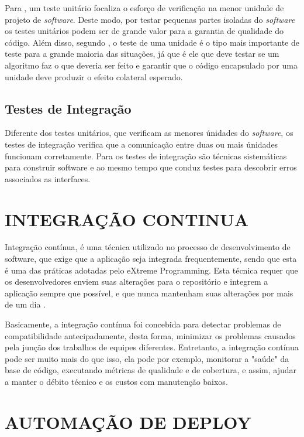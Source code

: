Para , um teste unitário focaliza o esforço de verificação na menor unidade de projeto de \textit{software}. Deste modo, por testar pequenas partes isoladas do \textit{software} os testes unitários podem ser de grande valor para a garantia de qualidade do código. Além disso, segundo , o teste de uma unidade é o tipo mais importante de teste para a grande maioria das situações, já que é ele que deve testar se um algoritmo faz o que deveria ser feito e garantir que o código encapsulado por uma unidade deve produzir o efeito colateral esperado.

\subsection{Testes de Integração}

Diferente dos testes unitários, que verificam as menores únidades do \textit{software}, os testes de integração verifica que a comunicação entre duas ou mais únidades funcionam corretamente. Para  os testes de integração são técnicas sistemáticas para construir software e ao mesmo tempo que conduz testes para descobrir erros associados as interfaces.

\section{INTEGRAÇÃO CONTINUA}

Integração contínua, é uma técnica utilizado no processo de desenvolvimento de software, que exige que a aplicação seja integrada frequentemente, sendo que esta é uma das práticas adotadas pelo eXtreme Programming. Esta técnica requer que os desenvolvedores enviem suas alterações para o repositório e integrem a aplicação sempre que possível, e que nunca mantenham suas alterações por mais de um dia \cite{wells}. 

Basicamente, a integração contínua foi concebida para detectar problemas de compatibilidade antecipadamente, desta forma, minimizar os problemas causados pela junção dos trabalhos de equipes diferentes. Entretanto, a integração contínua pode ser muito mais do que isso, ela pode por exemplo, monitorar a "saúde"  da base de código, executando métricas de qualidade e de cobertura, e assim, ajudar a manter o débito técnico e os custos com manutenção baixos.

\section{AUTOMAÇÃO DE DEPLOY}
